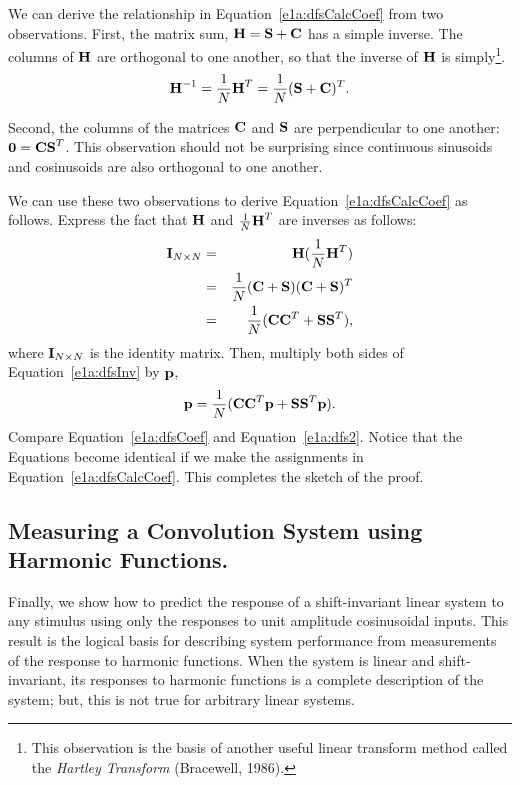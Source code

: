 We can derive the relationship in Equation~\ref{e1a:dfsCalcCoef} from
two observations.  First, the matrix sum, $\mbox{${\bf H}$} = \mbox{$ \bf S$} +
\mbox{$ \bf C$}$ has a simple inverse.  The columns of $\mbox{${\bf H}$}$ are
orthogonal to one another, so that the inverse of $\mbox{${\bf H}$}$ is
simply\footnote{This observation is the basis of another useful linear
transform method called the {\em Hartley Transform} (Bracewell,
1986).}.
\[
\mbox{${\bf H}$}^{-1} = \frac{1}{N} \mbox{${\bf H}$}^{T} = \frac{1}{N} (\mbox{$ \bf S$} + \mbox{$ \bf C$})^T .
\]

Second, the columns of the matrices $\mbox{$ \bf C$}$ and $\mbox{$ \bf S$}$ are
perpendicular to one another: $\mbox{${\bf 0}$} = \mbox{$ \bf C$} \mbox{$ \bf S$}^{T}$.
This observation should not be surprising since continuous sinusoids
and cosinusoids are also orthogonal to one another.

We can use these two observations to derive
Equation~\ref{e1a:dfsCalcCoef} as follows.  Express the fact that
$\mbox{${\bf H}$}$ and $\frac{1}{N} \mbox{${\bf H}$}^{T}$ are inverses as follows: 
\begin{eqnarray}
\label{e1a:dfsInv}
{{\bf I}_{N \times N}} & = & \mbox{${\bf H}$} (\frac{1}{N} \mbox{${\bf H}$}^T ) \\
 & = & \frac{1}{N} (\mbox{$ \bf C$} + \mbox{$ \bf S$}) (\mbox{$ \bf C$} + \mbox{$ \bf S$})^T \\
 & = & \frac{1}{N} (\mbox{$ \bf C$} \mbox{$ \bf C$}^T + \mbox{$ \bf S$} \mbox{$ \bf S$}^T),
\end{eqnarray}
where ${\mbox{${\bf I}$}_{N \times N}}$ is the identity matrix.  Then,
multiply both sides of Equation~\ref{e1a:dfsInv} by $\mbox {$\bf p$}$,
\begin{equation}
\label{e1a:dfsCoef}
\mbox {$\bf p$} =  
  \frac{1}{N} 
    (\mbox{$ \bf C$} \mbox{$ \bf C$}^T \mbox {$\bf p$} + \mbox{$ \bf S$} \mbox{$ \bf S$}^T \mbox {$\bf p$} ).
\end{equation}   
Compare Equation~\ref{e1a:dfsCoef} and Equation~\ref{e1a:dfs2}.
Notice that the Equations become identical if we make the assignments
in Equation~\ref{e1a:dfsCalcCoef}.  This completes the sketch of the
proof.

\subsection*{Measuring a Convolution System using Harmonic Functions.}

Finally, we show how to predict the response of a shift-invariant
linear system to any stimulus using only the responses to unit
amplitude cosinusoidal inputs.  This result is the logical basis for
describing system performance from measurements of the response to
harmonic functions.  When the system is linear and shift-invariant,
its responses to harmonic functions is a complete description of the
system; but, this is not true for arbitrary linear systems.

